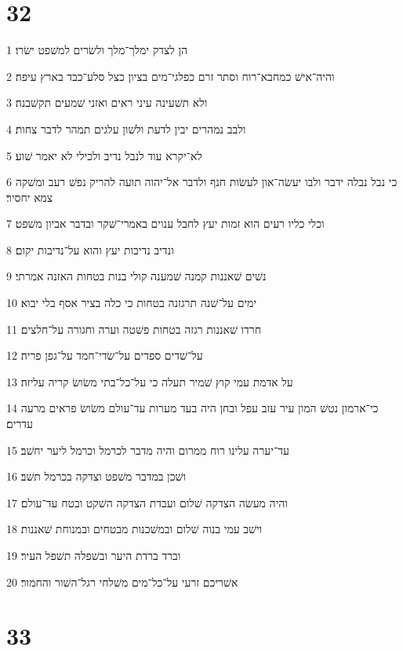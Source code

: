 \chapter{32}

\par 1 הן לצדק ימלך־מלך ולשׂרים למשׁפט ישׂרו׃
\par 2 והיה־אישׁ כמחבא־רוח וסתר זרם כפלגי־מים בציון כצל סלע־כבד בארץ עיפה׃
\par 3 ולא תשׁעינה עיני ראים ואזני שׁמעים תקשׁבנה׃
\par 4 ולבב נמהרים יבין לדעת ולשׁון עלגים תמהר לדבר צחות׃
\par 5 לא־יקרא עוד לנבל נדיב ולכילי לא יאמר שׁוע׃
\par 6 כי נבל נבלה ידבר ולבו יעשׂה־און לעשׂות חנף ולדבר אל־יהוה תועה להריק נפשׁ רעב ומשׁקה צמא יחסיר׃
\par 7 וכלי כליו רעים הוא זמות יעץ לחבל ענוים באמרי־שׁקר ובדבר אביון משׁפט׃
\par 8 ונדיב נדיבות יעץ והוא על־נדיבות יקום׃
\par 9 נשׁים שׁאננות קמנה שׁמענה קולי בנות בטחות האזנה אמרתי׃
\par 10 ימים על־שׁנה תרגזנה בטחות כי כלה בציר אסף בלי יבוא׃
\par 11 חרדו שׁאננות רגזה בטחות פשׁטה וערה וחגורה על־חלצים׃
\par 12 על־שׁדים ספדים על־שׂדי־חמד על־גפן פריה׃
\par 13 על אדמת עמי קוץ שׁמיר תעלה כי על־כל־בתי משׂושׂ קריה עליזה׃
\par 14 כי־ארמון נטשׁ המון עיר עזב עפל ובחן היה בעד מערות עד־עולם משׂושׂ פראים מרעה עדרים׃
\par 15 עד־יערה עלינו רוח ממרום והיה מדבר לכרמל וכרמל ליער יחשׁב׃
\par 16 ושׁכן במדבר משׁפט וצדקה בכרמל תשׁב׃
\par 17 והיה מעשׂה הצדקה שׁלום ועבדת הצדקה השׁקט ובטח עד־עולם׃
\par 18 וישׁב עמי בנוה שׁלום ובמשׁכנות מבטחים ובמנוחת שׁאננות׃
\par 19 וברד ברדת היער ובשׁפלה תשׁפל העיר׃
\par 20 אשׁריכם זרעי על־כל־מים משׁלחי רגל־השׁור והחמור׃

\chapter{33}


